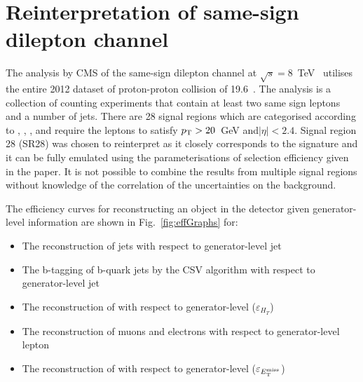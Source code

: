 \section{Reinterpretation of same-sign dilepton channel}

The analysis by CMS of the same-sign dilepton channel at $\sqrt{s}=8$~TeV~\cite{Chatrchyan:2013fea} utilises the entire 2012 dataset of proton-proton collision of 19.6~\fbinv. The analysis is a collection of counting experiments that contain at least two same sign leptons and a number of jets. There are 28 signal regions which are categorised according to \njets, \nbtags, \HT, \MET and require the leptons to satisfy $p_{\mathrm{T}}>20$~GeV and$|\eta|<2.4$. Signal region 28 (SR28) was chosen to reinterpret as it closely corresponds to the \tttt signature and it can be fully emulated using the parameterisations of selection efficiency given in the paper. It is not possible to combine the results from multiple signal regions without knowledge of the correlation of the uncertainties on the background. 

The efficiency curves for reconstructing an object in the detector given generator-level information are shown in Fig.~\ref{fig:effGraphs} for:
\begin{itemize}
\item The reconstruction of jets with respect to generator-level jet \pt 
\item The b-tagging of b-quark jets by the CSV algorithm with respect to generator-level jet \pt
\item The reconstruction of \HT with respect to generator-level \HT ($\varepsilon_{H_T}$)
\item The reconstruction of muons and electrons with respect to generator-level lepton \pt
\item The reconstruction of \MET with respect to generator-level \MET ($\varepsilon_{E_{\mathrm{T}}^{\text{miss}}}$)
\end{itemize}

